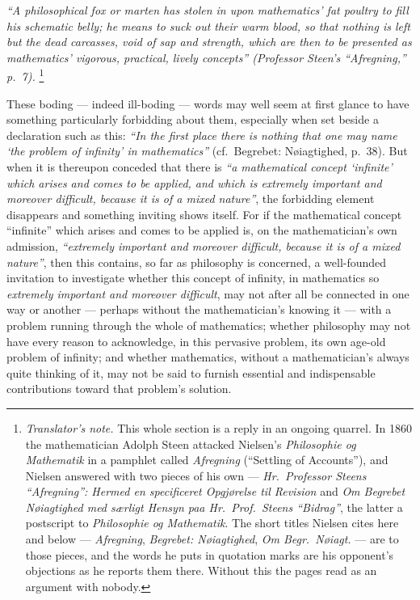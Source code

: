 \documentclass[12pt,a4paper]{book}
\renewcommand{\thefootnote}{\ifcase\value{footnote}\or *)\or **)\or ***)\fi}
\newcommand{\tnote}[1]{%
  \begingroup
  \renewcommand{\thefootnote}{\textdagger}%
  \footnote{\emph{Translator's note.} #1}%
  \addtocounter{footnote}{-1}%
  \endgroup}
\begin{document}
\emph{``A philosophical fox or marten has stolen in upon mathematics' fat
poultry to fill his schematic belly; he means to suck out their warm blood, so
that nothing is left but the dead carcasses, void of sap and strength, which
are then to be presented as mathematics' vigorous, practical, lively concepts''
(Professor Steen's ``Afregning,'' p.~7).}\tnote{This whole section is a reply in
an ongoing quarrel. In 1860 the mathematician Adolph Steen attacked Nielsen's
\emph{Philosophie og Mathematik} in a pamphlet called \emph{Afregning}
(``Settling of Accounts''), and Nielsen answered with two pieces of his own ---
\emph{Hr.\ Professor Steens ``Afregning'': Hermed en specificeret Opgjørelse til
Revision} and \emph{Om Begrebet Nøiagtighed med særligt Hensyn paa Hr.\ Prof.\
Steens ``Bidrag''}, the latter a postscript to \emph{Philosophie og Mathematik}.
The short titles Nielsen cites here and below --- \emph{Afregning},
\emph{Begrebet: Nøiagtighed}, \emph{Om Begr.\ Nøiagt.} --- are to those pieces,
and the words he puts in quotation marks are his opponent's objections as he
reports them there. Without this the pages read as an argument with nobody.}

These boding --- indeed ill-boding --- words may well seem at first glance to
have something particularly forbidding about them, especially when set beside a
declaration such as this: \emph{``In the first place there is nothing that one
may name `the problem of infinity' in mathematics''} (cf.\ Begrebet:
Nøiagtighed, p.~38). But when it is thereupon conceded that there is \emph{``a
mathematical concept `infinite' which arises and comes to be applied, and which
is extremely important and moreover difficult, because it is of a mixed
nature''}, the forbidding element disappears and something inviting shows
itself. For if the mathematical concept ``infinite'' which arises and comes to
be applied is, on the mathematician's own admission, \emph{``extremely
important and moreover difficult, because it is of a mixed nature''}, then this
contains, so far as philosophy is concerned, a
well-founded invitation to investigate whether this concept of infinity, in
mathematics so \emph{extremely important and moreover difficult}, may not after
all be connected in one way or another --- perhaps without the mathematician's
knowing it --- with a problem running through the whole of mathematics; whether
philosophy may not have every reason to acknowledge, in this pervasive problem,
its own age-old problem of infinity; and whether mathematics, without a
mathematician's always quite thinking of it, may not be said to furnish
essential and indispensable contributions toward that problem's solution.
\end{document}
